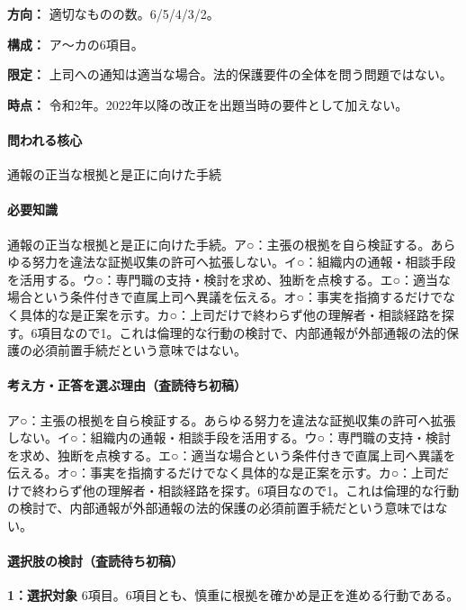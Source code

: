 \noindent\textbf{方向：} 適切なものの数。6/5/4/3/2。\par

\noindent\textbf{構成：} ア〜カの6項目。\par

\noindent\textbf{限定：} 上司への通知は適当な場合。法的保護要件の全体を問う問題ではない。\par

\noindent\textbf{時点：} 令和2年。2022年以降の改正を出題当時の要件として加えない。\par

\paragraph{問われる核心} 通報の正当な根拠と是正に向けた手続

\paragraph{必要知識} 通報の正当な根拠と是正に向けた手続。ア○：主張の根拠を自ら検証する。あらゆる努力を違法な証拠収集の許可へ拡張しない。イ○：組織内の通報・相談手段を活用する。ウ○：専門職の支持・検討を求め、独断を点検する。エ○：適当な場合という条件付きで直属上司へ異議を伝える。オ○：事実を指摘するだけでなく具体的な是正案を示す。カ○：上司だけで終わらず他の理解者・相談経路を探す。6項目なので1。これは倫理的な行動の検討で、内部通報が外部通報の法的保護の必須前置手続だという意味ではない。

\paragraph{考え方・正答を選ぶ理由（査読待ち初稿）} ア○：主張の根拠を自ら検証する。あらゆる努力を違法な証拠収集の許可へ拡張しない。イ○：組織内の通報・相談手段を活用する。ウ○：専門職の支持・検討を求め、独断を点検する。エ○：適当な場合という条件付きで直属上司へ異議を伝える。オ○：事実を指摘するだけでなく具体的な是正案を示す。カ○：上司だけで終わらず他の理解者・相談経路を探す。6項目なので1。これは倫理的な行動の検討で、内部通報が外部通報の法的保護の必須前置手続だという意味ではない。

\paragraph{選択肢の検討（査読待ち初稿）}\mbox{}\par

\noindent\textbf{1：選択対象} 6項目。6項目とも、慎重に根拠を確かめ是正を進める行動である。\par

